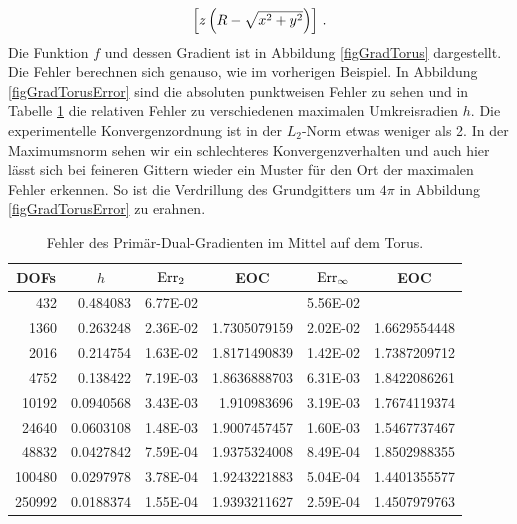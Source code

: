 \begin{beispiel}[Torus]
\begin{align}
\begin{bmatrix}
                        z\left(R - \sqrt{x^{2}+y^{2}}\right)
                      \end{bmatrix} \,\text{.}
      \end{align}
      Die Funktion \( f \) und dessen Gradient ist in Abbildung \ref{figGradTorus} dargestellt.
      Die Fehler berechnen sich genauso, wie im vorherigen Beispiel.
      In Abbildung \ref{figGradTorusError} sind die absoluten punktweisen Fehler zu sehen 
      und in Tabelle \ref{tabGradTorus} die relativen Fehler zu verschiedenen maximalen Umkreisradien \( h \).
      Die experimentelle Konvergenzordnung ist in der \( L_{2} \)-Norm etwas weniger als 2.
      In der Maximumsnorm sehen wir ein schlechteres Konvergenzverhalten und auch hier lässt sich bei feineren Gittern wieder ein
      Muster für den Ort der maximalen Fehler erkennen.
      So ist die Verdrillung des Grundgitters um \( 4\pi \) in Abbildung \ref{figGradTorusError} zu erahnen.

      \begin{table}[htbp]
       \centering
       \begin{tabular}{|r|r|r|r|r|r|}
       \hline
       \multicolumn{1}{|c|}{DOFs} & \multicolumn{1}{c|}{\( h \)} & \multicolumn{1}{c|}{\( \text{Err}_{2} \)} & \multicolumn{1}{c|}{EOC} &
       \multicolumn{1}{c|}{ \( \text{Err}_{\infty} \)} & \multicolumn{1}{c|}{EOC} \\ \hline
        432 & 0.484083 & 6.77E-02 & \multicolumn{1}{l|}{} & 5.56E-02 & \multicolumn{1}{l|}{} \\ \hline
        1360 & 0.263248 & 2.36E-02 & 1.7305079159 & 2.02E-02 & 1.6629554448 \\ \hline
        2016 & 0.214754 & 1.63E-02 & 1.8171490839 & 1.42E-02 & 1.7387209712 \\ \hline
        4752 & 0.138422 & 7.19E-03 & 1.8636888703 & 6.31E-03 & 1.8422086261 \\ \hline
        10192 & 0.0940568 & 3.43E-03 & 1.910983696 & 3.19E-03 & 1.7674119374 \\ \hline
        24640 & 0.0603108 & 1.48E-03 & 1.9007457457 & 1.60E-03 & 1.5467737467 \\ \hline
        48832 & 0.0427842 & 7.59E-04 & 1.9375324008 & 8.49E-04 & 1.8502988355 \\ \hline
        100480 & 0.0297978 & 3.78E-04 & 1.9243221883 & 5.04E-04 & 1.4401355577 \\ \hline
        250992 & 0.0188374 & 1.55E-04 & 1.9393211627 & 2.59E-04 & 1.4507979763 \\ \hline
       \end{tabular}
       \caption[Gradient auf Torus]{Fehler des Primär-Dual-Gradienten im Mittel auf dem Torus.}
       \label{tabGradTorus}
      \end{table}
    \end{beispiel}
